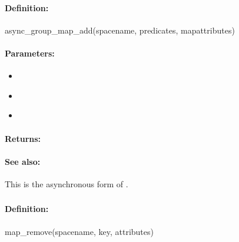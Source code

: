 \paragraph{Definition:}
\begin{rubycode}
async_group_map_add(spacename, predicates, mapattributes)
\end{rubycode}

\paragraph{Parameters:}
\begin{itemize}[noitemsep]
\item {}\\

\item {}\\

\item {}\\

\end{itemize}

\paragraph{Returns:}


\paragraph{See also:}  This is the asynchronous form of .

\pagebreak
\subsubsection{}
\label{api:ruby:map_remove}


\paragraph{Definition:}
\begin{rubycode}
map_remove(spacename, key, attributes)
\end{rubycode}

